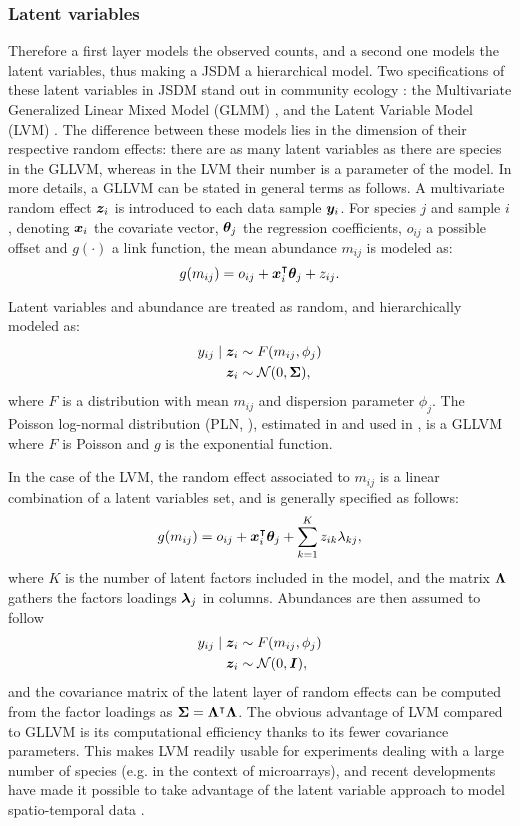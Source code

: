 \subsubsection{Latent variables}
 Therefore a first layer models the observed counts, and a second one models the latent variables, thus making a JSDM a hierarchical model. Two specifications of these latent variables in JSDM stand out in community ecology \citep{WBO15}:  the Multivariate Generalized Linear Mixed Model (GLMM) \citep{OHS10, PTM14}, and the Latent Variable Model (LVM)  \citep{OAP16}. The difference between these models lies in the dimension of their respective random effects: there are as many latent variables as there are species in the GLLVM, whereas in the LVM their number is a parameter of the model. In more details, a GLLVM can be stated in  general terms as follows. A multivariate random effect ${\boldsymbol{z}}_i$ is introduced to each data sample ${\boldsymbol{y}}_i$.  For species $j$ and sample $i$, denoting ${\boldsymbol{x}}_i$ the covariate vector, ${\boldsymbol{\theta}}_j$ the  regression coefficients, $o_{ij}$ a possible offset  and $g(\cdot)$ a link function, the mean abundance $m_{ij}$  is modeled as:
$$g(m_{ij}) = o_{ij}+{\boldsymbol{x}}_i^\intercal  {\boldsymbol{\theta}}_j + z_{ij}.$$
 
 Latent variables and abundance are treated as random, and hierarchically modeled as:
 \begin{align*}
 y_{ij}\mid {\boldsymbol{z}}_i &\sim F(m_{ij}, \phi_j)\\
 {\boldsymbol{z}}_i &\sim \mathcal{N}(0, {\boldsymbol{\Sigma}}),
 \end{align*} 
 where $F$ is a distribution with mean $m_{ij}$ and dispersion parameter $\phi_j$. The Poisson log-normal distribution (PLN, \citet{AiH89}), estimated in \citet{CMR18} and used in \citet{MRA20}, is a GLLVM where $F$ is Poisson and $g$ is the exponential function.  
 
In the case of the LVM, the random effect associated to $m_{ij}$ is a linear combination of a latent variables set, and is generally specified as follows:
 $$g(m_{ij}) = o_{ij}+{\boldsymbol{x}}_i^\intercal  {\boldsymbol{\theta}}_j +\sum_{k=1}^K z_{ik} \lambda_{kj},$$
 where $K$ is the number of latent factors included in the model, and the matrix ${\boldsymbol{\Lambda}}$ gathers the factors loadings ${\boldsymbol{\lambda}}_j$ in columns. Abundances are then assumed to follow
 \begin{align*}
 y_{ij}\mid {\boldsymbol{z}}_i &\sim F(m_{ij}, \phi_j)\\
{\boldsymbol{z}}_i&\sim \mathcal{N}(0, \boldsymbol{I}),
 \end{align*}
and the covariance matrix of the latent layer of random effects can be computed from the factor loadings as ${\boldsymbol{\Sigma}}={\boldsymbol{\Lambda}}^\intercal {\boldsymbol{\Lambda}}$. The obvious advantage of  LVM compared to GLLVM is  its computational efficiency thanks to its fewer covariance parameters. This makes LVM readily usable for experiments dealing with a large number of species (e.g. in the context of microarrays), and recent developments have made it possible to take advantage of the latent variable approach to model spatio-temporal data \citep{OTN17}.
 
